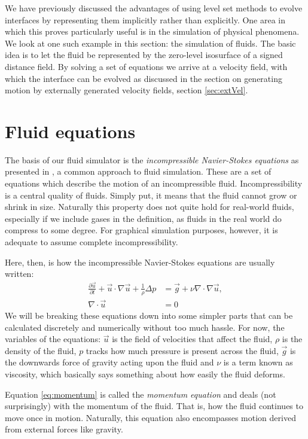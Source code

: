 We have previously discussed the advantages of using level set methods
to evolve interfaces by representing them implicitly rather than
explicitly. One area in which this proves particularly useful is in
the simulation of physical phenomena. We look at one such example in
this section: the simulation of fluids.  The basic idea is to let the
fluid be represented by the zero-level isosurface of a signed distance
field. By solving a set of equations we arrive at a velocity field,
with which the interface can be evolved as discussed in the section on
generating motion by externally generated velocity fields, section
\vref{sec:extVel}.

\section{Fluid equations}
The basis of our fluid simulator is the \emph{incompressible
  Navier-Stokes equations} as presented in , a
common approach to fluid simulation. These are a set of equations
which describe the motion of an incompressible
fluid. Incompressibility is a central quality of fluids. Simply put,
it means that the fluid cannot grow or shrink in size. Naturally this
property does not quite hold for real-world fluids, especially if we
include gases in the definition, as fluids in the real world do
compress to some degree. For graphical simulation purposes, however,
it is adequate to assume complete incompressibility.


Here, then, is how the incompressible Navier-Stokes equations are
usually written:
\begin{align}
  \label{eq:momentum}
  \frac{\partial\vec{u}}{\partial t}+\vec{u} \cdot \nabla\vec{u} + \frac{1}{\rho}\Delta p &= \vec{g}+\nu\nabla\cdot\nabla\vec{u},\\
  \label{eq:incomp}
  \nabla\cdot\vec{u}&=0
\end{align}
We will be breaking these equations down into some simpler parts that
can be calculated discretely and numerically without too much
hassle. For now, the variables of the equations: $\vec u$ is the field
of velocities that affect the fluid, $\rho$ is the density of the
fluid, $p$ tracks how much pressure is present across the fluid,
$\vec{g}$ is the downwards force of gravity acting upon the fluid and
$\nu$ is a term known as viscosity, which basically says something
about how easily the fluid deforms.

Equation \vref{eq:momentum} is called the \emph{momentum equation} and
deals (not surprisingly) with the momentum of the fluid. That is, how
the fluid continues to move once in motion. Naturally, this equation
also encompasses motion derived from external forces like gravity.

